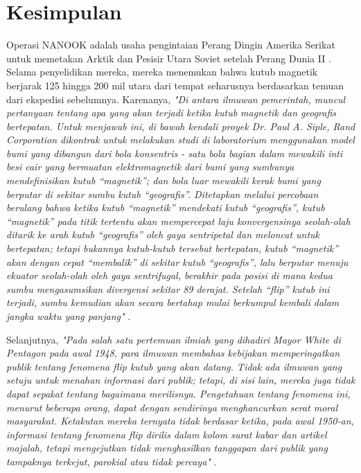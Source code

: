\documentclass[10pt,twocolumn,letterpaper]{article}
\begin{document}
\section{Kesimpulan}

Operasi NANOOK adalah usaha pengintaian Perang Dingin Amerika Serikat untuk memetakan Arktik dan Pesisir Utara Soviet setelah Perang Dunia II \cite{137}. Selama penyelidikan mereka, mereka menemukan bahwa kutub magnetik berjarak 125 hingga 200 mil utara dari tempat seharusnya berdasarkan temuan dari ekspedisi sebelumnya. Karenanya, \textit{"Di antara ilmuwan pemerintah, muncul pertanyaan tentang apa yang akan terjadi ketika kutub magnetik dan geografis bertepatan. Untuk menjawab ini, di bawah kendali proyek Dr. Paul A. Siple, Rand Corporation dikontrak untuk melakukan studi di laboratorium menggunakan model bumi yang dibangun dari bola konsentris - satu bola bagian dalam mewakili inti besi cair yang bermuatan elektromagnetik dari bumi yang sumbunya mendefinisikan kutub “magnetik”; dan bola luar mewakili kerak bumi yang berputar di sekitar sumbu kutub “geografis”. Ditetapkan melalui percobaan berulang bahwa ketika kutub “magnetik” mendekati kutub “geografis”, kutub “magnetik” pada titik tertentu akan mempercepat laju konvergensinya seolah-olah ditarik ke arah kutub “geografis” oleh gaya sentripetal dan meloncat untuk bertepatan; tetapi bukannya kutub-kutub tersebut bertepatan, kutub “magnetik” akan dengan cepat “membalik” di sekitar kutub “geografis”, lalu berputar menuju ekuator seolah-olah oleh gaya sentrifugal, berakhir pada posisi di mana kedua sumbu mengasumsikan divergensi sekitar 89 derajat. Setelah “flip” kutub ini terjadi, sumbu kemudian akan secara bertahap mulai berkumpul kembali dalam jangka waktu yang panjang"} \cite{138,139}.

Selanjutnya, \textit{"Pada salah satu pertemuan ilmiah yang dihadiri Mayor White di Pentagon pada awal 1948, para ilmuwan membahas kebijakan memperingatkan publik tentang fenomena flip kutub yang akan datang. Tidak ada ilmuwan yang setuju untuk menahan informasi dari publik; tetapi, di sisi lain, mereka juga tidak dapat sepakat tentang bagaimana merilisnya. Pengetahuan tentang fenomena ini, menurut beberapa orang, dapat dengan sendirinya menghancurkan serat moral masyarakat. Ketakutan mereka ternyata tidak berdasar ketika, pada awal 1950-an, informasi tentang fenomena flip dirilis dalam kolom surat kabar dan artikel majalah, tetapi mengejutkan tidak menghasilkan tanggapan dari publik yang tampaknya terkejut, parokial atau tidak percaya"} \cite{138,139}.
\end{document}
